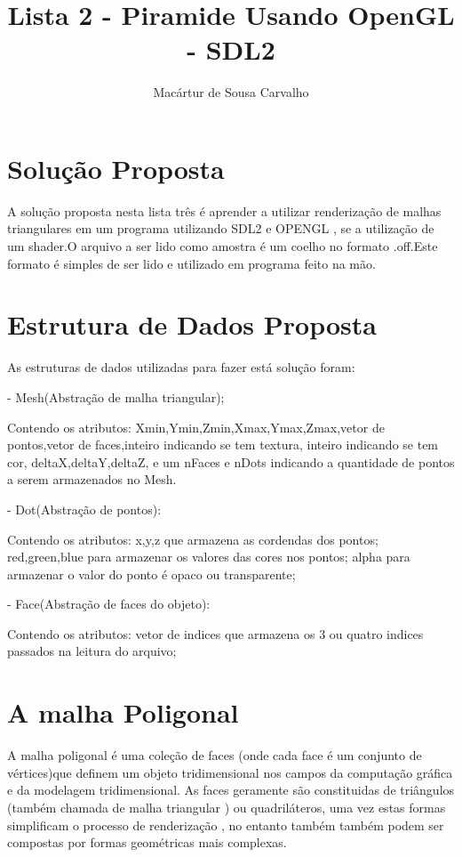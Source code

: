 \documentclass[12pt]{article}
\begin{document}
\title{Lista 2 - Piramide Usando OpenGL - SDL2}
\author{Mac\'artur de Sousa Carvalho}
\maketitle

\section{Solu\c{c}\~ao Proposta}
	A solu\c{c}\~ao proposta nesta lista tr\^es \'e aprender a utilizar renderiza\c{c}\~ao de malhas triangulares
	em um programa utilizando SDL2 e OPENGL , se a utiliza\c{c}\~ao de um shader.O arquivo a ser lido como amostra 
	\'e um coelho no formato .off.Este formato \'e simples de ser lido e utilizado em programa feito na m\~ao.	
	
\section{Estrutura de Dados Proposta}
	As estruturas de dados utilizadas para fazer est\'a solu\c{c}\~ao foram: 
	  
	  - Mesh(Abstra\c{c}\~ao de malha triangular);
	  
	    Contendo os atributos:  
	      Xmin,Ymin,Zmin,Xmax,Ymax,Zmax,vetor de pontos,vetor de faces,inteiro indicando se tem textura,
	      inteiro indicando se tem cor, deltaX,deltaY,deltaZ, e um nFaces e nDots indicando a quantidade de pontos
	      a serem armazenados no Mesh.
	   
	  - Dot(Abstra\c{c}\~ao de pontos):
	    
	    Contendo os atributos:
	      x,y,z que armazena as cordendas dos pontos;
	      red,green,blue para armazenar os valores das cores nos pontos;
	      alpha para armazenar o valor do ponto \'e opaco ou transparente;
	      
	   - Face(Abstra\c{c}\~ao de faces do objeto):
	    
	     Contendo os atributos:
	     vetor de indices que armazena os 3 ou quatro indices 
	     passados na leitura do arquivo;
	
	
	
\section{A malha Poligonal}
    A malha poligonal \'e uma cole\c{c}\~ao de faces (onde cada face \'e um conjunto de v\'ertices)que
    definem um objeto tridimensional nos campos da computa\c{c}\~ao gr\'afica e da modelagem tridimensional.
    As faces geramente s\~ao constituidas de tri\^angulos (tamb\'em chamada de malha triangular )  ou quadril\'ateros, uma vez estas formas simplificam o processo de renderiza\c{c}\~ao 
    , no entanto tamb\'em tamb\'em podem ser compostas por formas geom\'etricas mais complexas.
  
\end{document}
